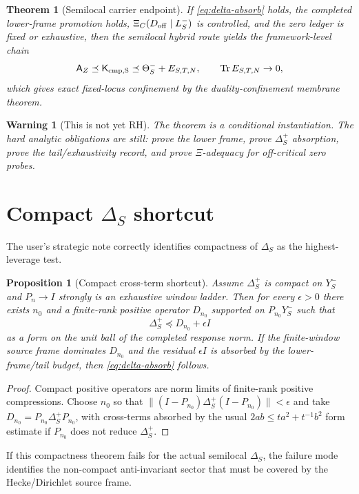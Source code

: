 \documentclass[11pt]{article}
\newtheorem{theorem}{Theorem}
\newtheorem{proposition}{Proposition}
\newtheorem{warning}{Warning}
\newcommand{\Y}{Y}
\newcommand{\Tr}{\operatorname{Tr}}
\begin{document}
\begin{theorem}[Semilocal carrier endpoint]
If \eqref{eq:delta-absorb} holds, the completed lower-frame promotion holds, $\Xi_C(D_{\rm off}\mid L_S^-)$ is controlled, and the zero ledger is fixed or exhaustive, then the semilocal hybrid route yields the framework-level chain
\[
  \mathsf A_Z\preceq \mathsf K_{\rm cmp,S}\preceq \Theta_S^-+E_{S,T,N},
  \qquad \Tr E_{S,T,N}\to0,
\]
which gives exact fixed-locus confinement by the duality-confinement membrane theorem.
\end{theorem}

\begin{warning}[This is not yet RH]
The theorem is a conditional instantiation.  The hard analytic obligations are still: prove the lower frame, prove $\Delta_S^+$ absorption, prove the tail/exhaustivity record, and prove $\Xi$-adequacy for off-critical zero probes.
\end{warning}

\section{Compact $\Delta_S$ shortcut}
The user's strategic note correctly identifies compactness of $\Delta_S$ as the highest-leverage test.

\begin{proposition}[Compact cross-term shortcut]
Assume $\Delta_S^+$ is compact on $\Y_S^-$ and $P_n\to I$ strongly is an exhaustive window ladder.  Then for every $\epsilon>0$ there exists $n_0$ and a finite-rank positive operator $D_{n_0}$ supported on $P_{n_0}\Y_S^-$ such that
\[
  \Delta_S^+\preceq D_{n_0}+\epsilon I
\]
as a form on the unit ball of the completed response norm.  If the finite-window source frame dominates $D_{n_0}$ and the residual $\epsilon I$ is absorbed by the lower-frame/tail budget, then \eqref{eq:delta-absorb} follows.
\end{proposition}

\begin{proof}
Compact positive operators are norm limits of finite-rank positive compressions.  Choose $n_0$ so that $\|(I-P_{n_0})\Delta_S^+(I-P_{n_0})\|<\epsilon$ and take $D_{n_0}=P_{n_0}\Delta_S^+P_{n_0}$, with cross-terms absorbed by the usual $2ab\le t a^2+t^{-1}b^2$ form estimate if $P_{n_0}$ does not reduce $\Delta_S^+$.
\end{proof}

If this compactness theorem fails for the actual semilocal $\Delta_S$, the failure mode identifies the non-compact anti-invariant sector that must be covered by the Hecke/Dirichlet source frame.
\end{document}
